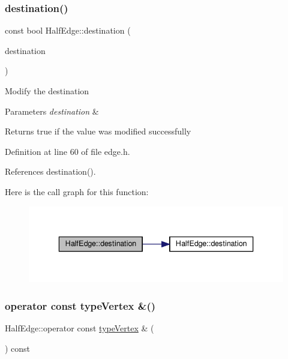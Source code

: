 \subsubsection{\texorpdfstring{destination()}{destination()}\hspace{0.1cm}{\footnotesize\ttfamily [2/2]}}
{\footnotesize\ttfamily const bool Half\+Edge\+::destination (\begin{DoxyParamCaption}\item[{const \hyperlink{edge_8h_a5fbd20c46956d479cb10afc9855223f6}{type\+Vertex} \&}]{destination }\end{DoxyParamCaption})\hspace{0.3cm}{\ttfamily [inline]}}

Modify the destination 
\begin{DoxyParams}{Parameters}
{\em destination} & \\
\hline
\end{DoxyParams}
\begin{DoxyReturn}{Returns}
true if the value was modified successfully 
\end{DoxyReturn}


Definition at line 60 of file edge.\+h.



References destination().

Here is the call graph for this function\+:\nopagebreak
\begin{figure}[H]
\begin{center}
\leavevmode
\includegraphics[width=336pt]{classHalfEdge_ac9f0f75077407355bde248e083d98161_cgraph}
\end{center}
\end{figure}
\mbox{\label{classHalfEdge_a68ec8852ea749e21798e7d65deff483e}} 
\subsubsection{\texorpdfstring{operator const type\+Vertex \&()}{operator const typeVertex \&()}}
{\footnotesize\ttfamily Half\+Edge\+::operator const \hyperlink{edge_8h_a5fbd20c46956d479cb10afc9855223f6}{type\+Vertex} \& (\begin{DoxyParamCaption}{ }\end{DoxyParamCaption}) const\hspace{0.3cm}{\ttfamily [inline]}}

